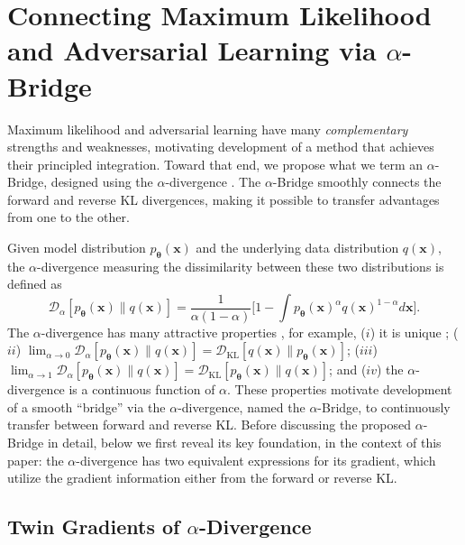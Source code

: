 \documentclass[letterpaper]{article} %
\newcommand{\Dc}[0]{\ensuremath{\mathcal{D}} }
\newcommand{\xv}[0]{\ensuremath{\boldsymbol{x}} }
\newcommand{\thetav}[0]{\ensuremath{\boldsymbol{\theta}} }
\newcommand{\KL}[0]{\ensuremath{\mathrm{KL}} }
\begin{document}
\section{Connecting Maximum Likelihood and Adversarial Learning via $\alpha$-Bridge}
\label{sec:Trans}



Maximum likelihood and adversarial learning have many {\em complementary} strengths and weaknesses, motivating development of a method that achieves their principled integration. Toward that end, we propose what we term an $\alpha$-Bridge, designed using the $\alpha$-divergence \cite{cichocki2010families}. The $\alpha$-Bridge smoothly connects the forward and reverse KL divergences, making it possible to transfer advantages from one to the other.


Given model distribution $p_{\thetav}(\xv)$ and the underlying data distribution $q(\xv)$, the $\alpha$-divergence measuring the dissimilarity between these two distributions is defined as
\begin{equation}\label{eq:alpha-div}
    \Dc_{\alpha} [p_{\thetav}(\xv) \| q(\xv)]
    = \frac{1}{\alpha (1 - \alpha)} \Big[
    1 - \int p_{\thetav}(\xv)^{\alpha} q(\xv)^{1-\alpha} d\xv \Big].
\end{equation}
The $\alpha$-divergence has many attractive properties \cite{cichocki2010families}, for example,
($i$) it is unique \cite{amari2009alpha};
($ii$) $\lim_{\alpha \to 0} \Dc_{\alpha} [p_{\thetav} (\xv) \| q(\xv) ] = \Dc_{\KL} [q(\xv) \| p_{\thetav} (\xv) ]$;
($iii$) $\lim_{\alpha \to 1} \Dc_{\alpha} [p_{\thetav}(\xv) \| q(\xv) ] = \Dc_{\KL} [p_{\thetav}(\xv) \| q(\xv) ]$; and
($iv$) the $\alpha$-divergence is a continuous function of $\alpha$.
These properties motivate development of a smooth ``bridge'' via the $\alpha$-divergence, named the $\alpha$-Bridge, to continuously transfer between forward and reverse KL. Before discussing the proposed $\alpha$-Bridge in detail, below we first reveal its key foundation, in the context of this paper: the $\alpha$-divergence has two equivalent expressions for its gradient, which utilize the gradient information either from the forward or reverse KL.

\subsection{Twin Gradients of $\alpha$-Divergence}
\label{sec:Grad}
\end{document}
